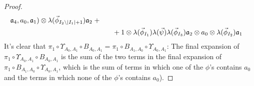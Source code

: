\begin{proof}
\begin{align*}
  \mathfrak{a}_4, a_0, \mathfrak{a}_1) \otimes 
  \lambda(\vec{\phi}_{I_2 \backslash |I_1| + 1}) 
  \mathfrak{a}_2 \; + \\
&\hphantom{{}==} 
  + 1 \otimes \lambda(\vec{\phi}_{I_1}) \lambda(\vec{\psi}) 
  \lambda(\vec{\phi}_{I_3}) \mathfrak{a}_2 \otimes 
  a_0 \otimes \lambda(\vec{\phi}_{I_2}) \mathfrak{a}_1
\end{align*}
%
It's clear that $\pi_1 \circ \Upsilon_{A_0,A_1} 
\circ B_{A_0,A_1} =  \pi_1 \circ B_{A_1,A_0} 
\circ \Upsilon_{A_0,A_1}$: The final expansion of 
$\pi_1 \circ \Upsilon_{A_0,A_1} \circ B_{A_0,A_1}$ 
is the sum of the two terms in the final expansion 
of $\pi_1 \circ B_{A_1,A_0} \circ \Upsilon_{A_0,A_1}$, 
which is the sum of terms in which one of 
the $\phi$'s contains $a_0$ and the terms in which 
none of the $\phi$'s contains $a_0$).
\end{proof}